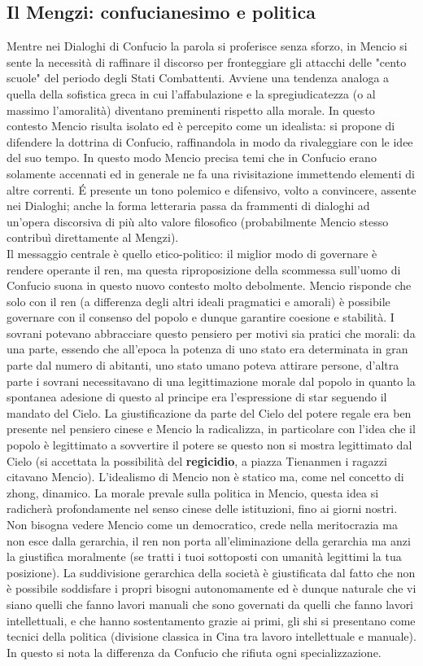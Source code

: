 \documentclass[10pt,a4paper]{report}
\begin{document}
\subsection{Il Mengzi: confucianesimo e politica}
Mentre nei Dialoghi di Confucio la parola si proferisce senza sforzo, in Mencio si sente la necessità di raffinare il discorso per fronteggiare gli attacchi delle "cento scuole" del periodo degli Stati Combattenti. Avviene una tendenza analoga a quella della sofistica greca in cui l'affabulazione e la spregiudicatezza (o al massimo l'amoralità) diventano preminenti rispetto alla morale. In questo contesto Mencio risulta isolato ed è percepito come un idealista: si propone di difendere la dottrina di Confucio, raffinandola in modo da rivaleggiare con le idee del suo tempo. In questo modo Mencio precisa temi che in Confucio erano solamente accennati ed in generale ne fa una rivisitazione immettendo elementi di altre correnti. \'E presente un tono polemico e difensivo, volto a convincere, assente nei Dialoghi; anche la forma letteraria passa da frammenti di dialoghi ad un'opera discorsiva di più alto valore filosofico (probabilmente Mencio stesso contribuì direttamente al Mengzi).\\
Il messaggio centrale è quello etico-politico: il miglior modo di governare è rendere operante il ren, ma questa riproposizione della scommessa sull'uomo di Confucio suona in questo nuovo contesto molto debolmente. Mencio risponde che solo con il ren (a differenza degli altri ideali pragmatici e amorali) è possibile governare con il consenso del popolo e dunque garantire coesione e stabilità. I sovrani potevano abbracciare questo pensiero per motivi sia pratici che morali: da una parte, essendo che all'epoca la potenza di uno stato era determinata in gran parte dal numero di abitanti, uno stato umano poteva attirare persone, d'altra parte i sovrani necessitavano di una legittimazione morale dal popolo in quanto la spontanea adesione di questo al principe era l'espressione di star seguendo il mandato del Cielo. La giustificazione da parte del Cielo del potere regale era ben presente nel pensiero cinese e Mencio la radicalizza, in particolare con l'idea che il popolo è legittimato a sovvertire il potere se questo non si mostra legittimato dal Cielo (si accettata la possibilità del \textbf{regicidio}, a piazza Tienanmen i ragazzi citavano Mencio). L'idealismo di Mencio non è statico ma, come nel concetto di zhong, dinamico. La morale prevale sulla politica in Mencio, questa idea si radicherà profondamente nel senso cinese delle istituzioni, fino ai giorni nostri. Non bisogna vedere Mencio come un democratico, crede nella meritocrazia ma non esce dalla gerarchia, il ren non porta all'eliminazione della gerarchia ma anzi la giustifica moralmente (se tratti i tuoi sottoposti con umanità legittimi la tua posizione). La suddivisione gerarchica della società è giustificata dal fatto che non è possibile soddisfare i propri bisogni autonomamente ed è dunque naturale che vi siano quelli che fanno lavori manuali che sono governati da quelli che fanno lavori intellettuali, e che hanno sostentamento grazie ai primi, gli shi si presentano come tecnici della politica (divisione classica in Cina tra lavoro intellettuale e manuale). In questo si nota la differenza da Confucio che rifiuta ogni specializzazione.  
\end{document}
